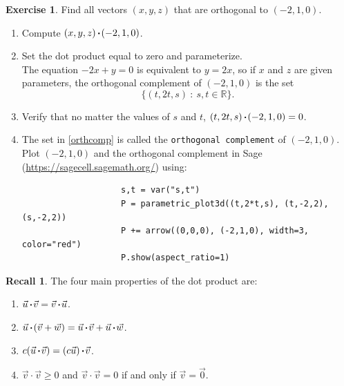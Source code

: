\documentclass{beamer}
\newcommand{\R}{\mathbb{R}}
\newcommand{\fn}{\insertframenumber}
\newcommand{\dotp}{\,{\boldsymbol{\cdot}\hspace*{.01in}}}
\theoremstyle{definition}
\newtheorem{exercise}{Exercise}
\newtheorem*{recall}{Recall}
\renewcommand{\emph}[1]{{\color{blue}\texttt{#1}}}
\begin{document}
\begin{frame}[fragile]
	\frametitle{\fn}
	\begin{exercise}
		Find all vectors $(x,y,z)$ that are orthogonal to $(-2,1,0)$.
		\begin{enumerate}[label=(\alph*)]
			\item Compute $(x,y,z)\dotp (-2,1,0)$.
			\item Set the dot product equal to zero and parameterize.\pause\\
				The equation $-2x+y=0$ is equivalent to $y=2x$, so if $x$ and $z$ are given parameters, the orthogonal complement of $(-2,1,0)$ is the set \begin{equation}\label{orthcomp}
					\{(t,2t,s)\ :\ s,t\in\R\}.
				\end{equation}
			\item Verify that no matter the values of $s$ and $t$, $(t,2t,s)\dotp(-2,1,0)=0$.\pause
			\item The set in \eqref{orthcomp} is called the \emph{orthogonal complement} of $(-2,1,0)$.  Plot $(-2,1,0)$ and the orthogonal complement in Sage (\url{https://sagecell.sagemath.org/}) using:
			{\tiny
				\begin{verbatim}
					s,t = var("s,t")
					P = parametric_plot3d((t,2*t,s), (t,-2,2),(s,-2,2))
					P += arrow((0,0,0), (-2,1,0), width=3, color="red")
					P.show(aspect_ratio=1)
					\end{verbatim}
			}
		\end{enumerate}
	\end{exercise}
\end{frame}
\begin{frame}{\fn}
	\begin{recall}
		The four main properties of the dot product are:
		\begin{enumerate}[label=\textbf{\arabic*.}]
			\item $\vec u\dotp\vec v=\vec v\dotp\vec u$.
			\item $\vec u\dotp(\vec v+\vec w)=\vec u\dotp\vec v+\vec u\dotp \vec w$.
			\item $c(\vec u\dotp \vec v)=(c\vec u)\dotp\vec v$.
			\item $\vec v\cdot\vec v\geq 0$ and $\vec v\cdot\vec v=0$ if and only if $\vec v=\vec 0$.
		\end{enumerate}
	\end{recall}
\end{frame}
\end{document}

